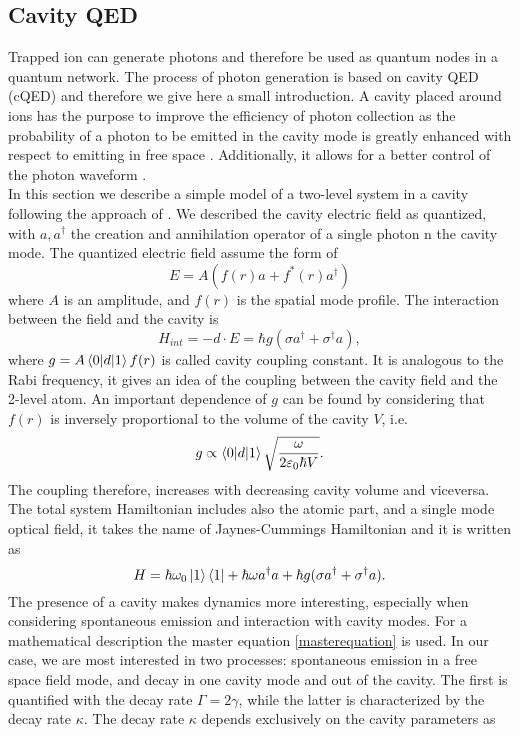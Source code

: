 \subsection{Cavity QED}
\label{sec:cavityqed}
Trapped ion can generate photons and therefore be used as quantum nodes in a quantum network. The process of photon generation is based on cavity QED (cQED) and therefore we give here a small introduction. A cavity placed around ions has the purpose to improve the efficiency of photon collection as the probability of a photon to be emitted in the cavity mode is greatly enhanced with respect to emitting in free space \cite{Kimble_1998}. Additionally, it allows for a better control of the photon waveform \cite{Keller2004}.\\
In this section we describe a simple model of a two-level system in a cavity following the approach of \cite{steck}. We described the cavity electric field as quantized, with $a,a^\dagger$ the creation and annihilation operator of a single photon n the cavity mode.
The quantized electric field assume the form of
\begin{equation}
E = A(f(r)a + f^*(r)a^\dagger)
\end{equation}
where $A$ is an amplitude, and $f(r)$ is the spatial mode profile. The interaction between the field and the cavity is
\begin{equation}
H_{int}  = -d\cdot E = \hbar g (\sigma a^\dagger + \sigma^\dagger a),
\end{equation}
where $g = A \braket{0|d|1} f(r)$ is called cavity coupling constant. It is analogous to the Rabi frequency, it gives an idea of the coupling between the cavity field and the 2-level atom. An important dependence of $g$ can be found by considering that $f(r)$ is inversely proportional to the volume of the cavity $V$, i.e.
\begin{equation}
g \propto \braket{0|d|1} \sqrt{\frac{\omega}{2\varepsilon_0 \hbar V}}.
\end{equation}
The coupling therefore, increases with decreasing cavity volume and viceversa.\\
The total system Hamiltonian includes also the atomic part, and a single mode optical field, it takes the name of Jaynes-Cummings Hamiltonian and it is written as \cite{qedreview}
\begin{equation}
H = \hbar \omega_0 \ket{1}\bra{1} + \hbar \omega a^\dagger a + \hbar g (\sigma a^\dagger + \sigma^\dagger a).
\end{equation}
The presence of a cavity makes dynamics more interesting, especially when considering spontaneous emission and interaction with cavity modes. For a mathematical description the master equation \eqref{masterequation} is used. In our case, we are most interested in two processes: spontaneous emission in a free space field mode, and decay in one cavity mode and out of the cavity. The first is quantified with the decay rate $\Gamma = 2\gamma$, while the latter is characterized by the decay rate $\kappa$. The decay rate $\kappa$ depends exclusively on the cavity parameters as \cite{helene}
